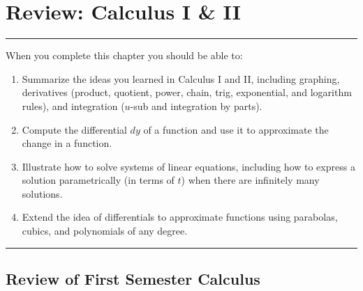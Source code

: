 \documentclass[10pt,]{book}
\theoremstyle{plain}
\theoremstyle{definition}
\theoremstyle{definition}
\theoremstyle{definition}
\theoremstyle{definition}
\newenvironment{objectives}[1]{\noindent\rule{\linewidth}{0.1ex}\newline{\textbf{{\large#1}}\par\smallskip}}{\par\noindent\rule{\linewidth}{0.1ex}\par\smallskip}
\theoremstyle{definition}
\numberwithin{equation}{section}
\begin{document}
\chapter[{Review: Calculus I \& II}]{Review: Calculus I \& II}\label{ch01_0_review}
\begin{objectives}{Objectives}\label{objectives-1}
When you complete this chapter you should be able to:%
%
\begin{enumerate}
\item\hypertarget{li-1}{}Summarize the ideas you learned in Calculus I and II, including graphing, derivatives (product, quotient, power, chain, trig, exponential, and logarithm rules), and integration (\(u\)-sub and integration by parts).%
\item\hypertarget{li-2}{}Compute the differential \(dy\) of a function and use it to approximate the change in a function.%
\item\hypertarget{li-3}{}Illustrate how to solve systems of linear equations, including how to express a solution parametrically (in terms of \(t\)) when there are infinitely many solutions.%
\item\hypertarget{li-4}{}Extend the idea of differentials to approximate functions using parabolas, cubics, and polynomials of any degree.%
\end{enumerate}
\end{objectives}
\typeout{************************************************}
\typeout{************************************************}
\section[{Review of First Semester Calculus}]{Review of First Semester Calculus}\label{ch01_1_calc1review}
\typeout{************************************************}
\typeout{************************************************}
\end{document}
